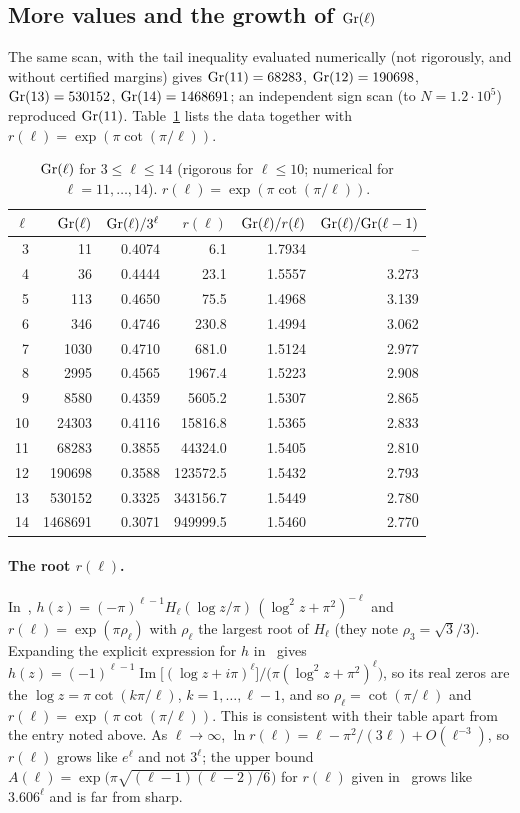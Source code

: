\subsection{More values and the growth of $\mathrm{Gr}(\ell)$}
The same scan, with the tail inequality evaluated numerically (not rigorously, and without certified margins) gives $\mathrm{Gr}(11)=68283$, $\mathrm{Gr}(12)=190698$, $\mathrm{Gr}(13)=530152$, $\mathrm{Gr}(14)=1468691$; an independent sign scan (to $N=1.2\cdot10^5$) reproduced $\mathrm{Gr}(11)$. Table~\ref{tab:gr} lists the data together with $r(\ell)=\exp(\pi\cot(\pi/\ell))$.

\begin{table}[h]
\centering
\caption{$\mathrm{Gr}(\ell)$ for $3\le\ell\le14$ (rigorous for $\ell\le10$; numerical for $\ell=11,\dots,14$). $r(\ell)=\exp(\pi\cot(\pi/\ell))$.}\label{tab:gr}
\begin{tabular}{rrrrrr}
\toprule
$\ell$ & $\mathrm{Gr}(\ell)$ & $\mathrm{Gr}(\ell)/3^\ell$ & $r(\ell)$ & $\mathrm{Gr}(\ell)/r(\ell)$ & $\mathrm{Gr}(\ell)/\mathrm{Gr}(\ell-1)$\\
\midrule
3 & 11 & 0.4074 & 6.1 & 1.7934 & --\\
4 & 36 & 0.4444 & 23.1 & 1.5557 & 3.273\\
5 & 113 & 0.4650 & 75.5 & 1.4968 & 3.139\\
6 & 346 & 0.4746 & 230.8 & 1.4994 & 3.062\\
7 & 1030 & 0.4710 & 681.0 & 1.5124 & 2.977\\
8 & 2995 & 0.4565 & 1967.4 & 1.5223 & 2.908\\
9 & 8580 & 0.4359 & 5605.2 & 1.5307 & 2.865\\
10 & 24303 & 0.4116 & 15816.8 & 1.5365 & 2.833\\
11 & 68283 & 0.3855 & 44324.0 & 1.5405 & 2.810\\
12 & 190698 & 0.3588 & 123572.5 & 1.5432 & 2.793\\
13 & 530152 & 0.3325 & 343156.7 & 1.5449 & 2.780\\
14 & 1468691 & 0.3071 & 949999.5 & 1.5460 & 2.770\\
\bottomrule
\end{tabular}
\end{table}

\paragraph{The root $r(\ell)$.} In~\cite{XZ}, $h(z)=(-\pi)^{\ell-1}H_\ell(\log z/\pi)\,(\log^2z+\pi^2)^{-\ell}$ and $r(\ell)=\exp(\pi\rho_\ell)$ with $\rho_\ell$ the largest root of $H_\ell$ (they note $\rho_3=\sqrt3/3$). Expanding the explicit expression for $h$ in~\cite{XZ} gives $h(z)=(-1)^{\ell-1}\operatorname{Im}\big[(\log z+i\pi)^\ell\big]\big/\big(\pi(\log^2z+\pi^2)^\ell\big)$, so its real zeros are the $\log z=\pi\cot(k\pi/\ell)$, $k=1,\dots,\ell-1$, and so $\rho_\ell=\cot(\pi/\ell)$ and $r(\ell)=\exp(\pi\cot(\pi/\ell))$. This is consistent with their table apart from the entry noted above. As $\ell\to\infty$, $\ln r(\ell)=\ell-\pi^2/(3\ell)+O(\ell^{-3})$, so $r(\ell)$ grows like $e^\ell$ and not $3^\ell$; the upper bound $A(\ell)=\exp\big(\pi\sqrt{(\ell-1)(\ell-2)/6}\big)$ for $r(\ell)$ given in~\cite{XZ} grows like $3.606^\ell$ and is far from sharp.

